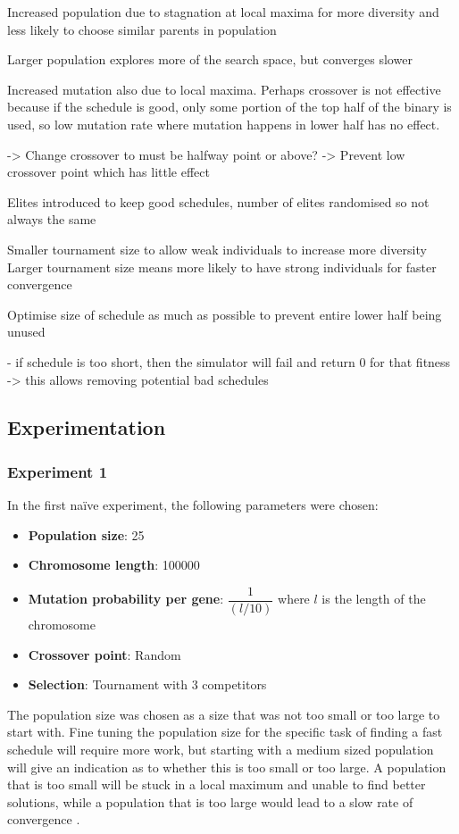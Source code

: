 \documentclass{article}
\begin{document}
Increased population due to stagnation at local maxima for more diversity and less likely to choose similar parents in population

Larger population explores more of the search space, but converges slower

Increased mutation also due to local maxima. Perhaps crossover is not effective because if the schedule is good, only some portion of the top half of the binary is used, so low mutation rate where mutation happens in lower half has no effect.

-> Change crossover to must be halfway point or above? -> Prevent low crossover point which has little effect

Elites introduced to keep good schedules, number of elites randomised so not always the same 

Smaller tournament size to allow weak individuals to increase more diversity
Larger tournament size means more likely to have strong individuals for faster convergence

Optimise size of schedule as much as possible to prevent entire lower half being unused


- if schedule is too short, then the simulator will fail and return 0 for that fitness -> this allows removing potential bad schedules

\subsection{Experimentation}
\subsubsection{Experiment 1}
In the first na\"{i}ve experiment, the following parameters were chosen:
\begin{itemize}
\item \textbf{Population size}: 25
\item \textbf{Chromosome length}: 100000
\item \textbf{Mutation probability per gene}: $\dfrac{1}{(l/10)}$ where $l$ is the length of the chromosome
\item \textbf{Crossover point}: Random
\item \textbf{Selection}: Tournament with 3 competitors
\end{itemize}
The population size was chosen as a size that was not too small or too large to start with. Fine tuning the population size for the specific task of finding a fast schedule will require more work, but starting with a medium sized population will give an indication as to whether this is too small or too large. A population that is too small will be stuck in a local maximum and unable to find better solutions, while a population that is too large would lead to a slow rate of convergence \cite{ga-size}. 
\end{document}
